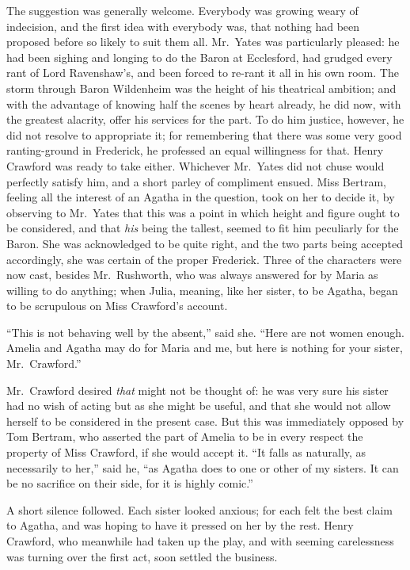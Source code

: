 The suggestion was generally welcome.  Everybody was growing
weary of indecision, and the first idea with everybody was,
that nothing had been proposed before so likely to suit
them all.  Mr.\ Yates was particularly pleased:  he had
been sighing and longing to do the Baron at Ecclesford,
had grudged every rant of Lord Ravenshaw's, and been forced
to re-rant it all in his own room.  The storm through Baron
Wildenheim was the height of his theatrical ambition;
and with the advantage of knowing half the scenes by
heart already, he did now, with the greatest alacrity,
offer his services for the part.  To do him justice,
however, he did not resolve to appropriate it;
for remembering that there was some very good ranting-ground
in Frederick, he professed an equal willingness for that.
Henry Crawford was ready to take either.  Whichever Mr.\ Yates
did not chuse would perfectly satisfy him, and a short
parley of compliment ensued.  Miss Bertram, feeling all
the interest of an Agatha in the question, took on her
to decide it, by observing to Mr.\ Yates that this was a
point in which height and figure ought to be considered,
and that \emph{his} being the tallest, seemed to fit him
peculiarly for the Baron.  She was acknowledged to be
quite right, and the two parts being accepted accordingly,
she was certain of the proper Frederick.  Three of the
characters were now cast, besides Mr.\ Rushworth, who was
always answered for by Maria as willing to do anything;
when Julia, meaning, like her sister, to be Agatha,
began to be scrupulous on Miss Crawford's account.

``This is not behaving well by the absent,'' said she.
``Here are not women enough.  Amelia and Agatha may do
for Maria and me, but here is nothing for your sister,
Mr.\ Crawford.''

Mr.\ Crawford desired \emph{that} might not be thought of:
he was very sure his sister had no wish of acting
but as she might be useful, and that she would not
allow herself to be considered in the present case.
But this was immediately opposed by Tom Bertram,
who asserted the part of Amelia to be in every respect
the property of Miss Crawford, if she would accept it.
``It falls as naturally, as necessarily to her,'' said he,
``as Agatha does to one or other of my sisters.  It can be no
sacrifice on their side, for it is highly comic.''

A short silence followed.  Each sister looked anxious;
for each felt the best claim to Agatha, and was hoping
to have it pressed on her by the rest.  Henry Crawford,
who meanwhile had taken up the play, and with seeming
carelessness was turning over the first act, soon settled
the business.

